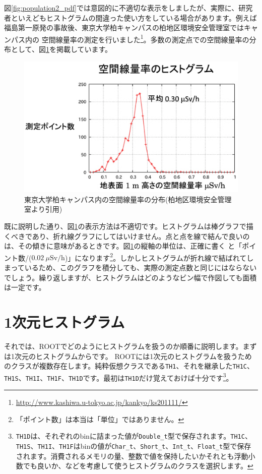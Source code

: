 図\ref{fig:population2_pdf}では意図的に不適切な表示をしましたが、実際に、研究者といえどもヒストグラムの間違った使い方をしている場合があります。例えば福島第一原発の事故後、東京大学柏キャンパスの柏地区環境安全管理室ではキャンパス内の 空間線量率の測定を行いました\footnote{\url{http://www.kashiwa.u-tokyo.ac.jp/kankyo/ks201111/}}。多数の測定点での空間線量率の分布として、図\ref{fig:Kashiwa_png}を掲載しています。

\begin{figure}
  \centering
  \includegraphics[scale=0.8]{fig/Kashiwa.png}
  \caption{東京大学柏キャンパス内の空間線量率の分布(柏地区環境安全管理室より引用)}
  \label{fig:Kashiwa_png}
\end{figure}

既に説明した通り、図\ref{fig:Kashiwa_png}の表示方法は不適切です。ヒストグラムは棒グラフで描くべきであり、折れ線グラフにしてはいけません。点と点を線で結んで良いのは、その傾きに意味があるときです。図\ref{fig:Kashiwa_png}の縦軸の単位は、正確に書く と「ポイント数/($0.02\ \mu\mathrm{Sv/h}$)」になります\footnote{「ポイント数」は本当は「単位」ではありません。}。しかしヒストグラムが折れ線で結ばれてしまっているため、このグラフを積分しても、実際の測定点数と同じにはならないでしょう。繰り返しますが、ヒストグラムはどのようなビン幅で作図しても面積は一定です。

\section{1次元ヒストグラム}

それでは、ROOTでどのようにヒストグラムを扱うのか順番に説明します。まずは1次元のヒストグラムからです。 ROOTには1次元のヒストグラムを扱うためのクラスが複数存在します。純粋仮想クラスである\texttt{TH1}、それを継承した\texttt{TH1C}、\texttt{TH1S}、\texttt{TH1I}、\texttt{TH1F}、\texttt{TH1D}です。最初は\texttt{TH1D}だけ覚えておけば十分です\footnote{\texttt{TH1D}は、それぞれのbinに詰まった値が\texttt{Double\_t}型で保存されます。\texttt{TH1C}、\texttt{TH1S}、\texttt{TH1I}、\texttt{TH1F}はbinの値が\texttt{Char\_t}、\texttt{Short\_t}、\texttt{Int\_t}、\texttt{Float\_t}型で保存されます。消費されるメモリの量、整数で値を保持したいかそれとも浮動小数でも良いか、などを考慮して使うヒストグラムのクラスを選択します。}。

